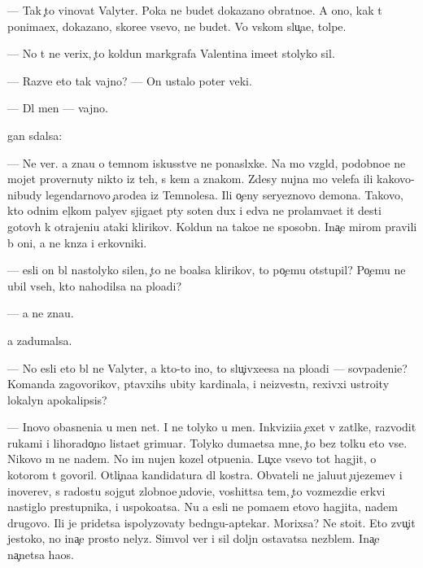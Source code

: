 \documentclass[10pt]{book}
\begin{document}
— Tak {\c}to vinovat Valyter. Poka ne budet dokazano obratno{\y}e. A ono, kak t{\yi} ponima{\y}ex, dokazano, skore{\y}e vsevo, ne budet. Vo vs{\ia}kom slu{\c}a{\y}e, tolpe.

— No t{\yi} ne verix, {\c}to koldun markgrafa Valentina ime{\y}et stolyko sil.

— Razve eto tak vajno? — On ustalo poter veki.

— Dl{\ia} men{\ia} — vajno.

{\Q}{\yi}gan sdalsa:

— Ne ver{\iu}. {\Y}a zna{\y}u o temnom iskusstve ne ponasl{\yi}xke. Na mo{\y} vzgl{\ia}d, podobno{\y}e ne mojet provernuty nikto iz teh, s kem {\y}a znakom. Zdesy nujna mo{\x} velefa ili kakovo-nibudy legendarnovo {\c}arode{\y}a iz Temnoles{\y}a. Ili o{\c}eny seryeznovo demona. Takovo, kto odnim {\x}el{\c}kom paly{\q}ev sjiga{\y}et p{\ia}ty soten dux i {\y}edva ne prolam{\yi}va{\y}et {\x}it des{\ia}ti gotov{\yi}h k otrajeni{\y}u ataki klirikov. Koldun{\yi} na tako{\y}e ne sposobn{\yi}. Ina{\c}e mirom pravili b{\yi} oni, a ne kn{\ia}z{\y}a i {\q}erkovniki.

— {\Y}esli on b{\yi}l nastolyko silen, {\c}to ne bo{\y}alsa klirikov, to po{\c}emu otstupil? Po{\c}emu ne ubil vseh, kto nahodilsa na plo{\x}adi?

— {\Y}a ne zna{\y}u.

{\Y}a zadumalsa.

— No {\y}esli eto b{\yi}l ne Valyter, a kto-to ino{\y}, to slu{\c}ivxe{\y}esa na plo{\x}adi — sovpadeni{\y}e? Komanda zagovor{\x}ikov, p{\yi}tavxihs{\ia} ubity kardinala, i ne{\y}izvestn{\yi}{\y}, rexivxi{\y} ustro{\y}ity lokalyn{\yi}{\y} apokalipsis?

— Inovo ob{\y}asneni{\y}a u men{\ia} net. I ne tolyko u men{\ia}. Inkvizi{\q}i{\y}a {\c}exet v zat{\yi}lke, razvodit rukami i lihorado{\c}no lista{\y}et grimuar{\yi}. Tolyko duma{\y}etsa mne, {\c}to bez tolku eto vse. Nikovo m{\yi} ne na{\y}dem. No im nujen kozel otpu{\x}eni{\y}a. Lu{\c}xe vsevo tot hagjit, o kotorom t{\yi} govoril. Otli{\c}na{\y}a kandidatura dl{\ia} kostra. Ob{\yi}vateli ne jalu{\y}ut {\c}ujezem{\q}ev i inover{\q}ev, s radost{\y}u sojgut zlobno{\y}e {\c}udovi{\x}e, voshit{\ia}tsa tem, {\c}to vozmezdi{\y}e {\Q}erkvi nastiglo prestupnika, i uspoko{\y}atsa. Nu a {\y}esli ne po{\y}ma{\y}em etovo hagjita, na{\y}dem drugovo. Ili je pridetsa ispolyzovaty bedn{\ia}gu-aptekar{\ia}. Mor{\x}ixsa? Ne sto{\y}it. Eto zvu{\c}it jestoko, no ina{\c}e prosto nelyz{\ia}. Simvol{\yi} ver{\yi} i sil{\yi} doljn{\yi} ostavatsa nez{\yi}blem{\yi}. Ina{\c}e na{\c}netsa haos.
\end{document}
